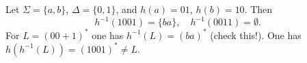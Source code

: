 

\setcounter{section}{3}
\setcounter{subsection}{4}
\setcounter{dfn}{16}

\begin{exl}
Let $\Sigma = \{a,b\}$, $\Delta = \{0, 1\}$, and $h(a) = 01$, $h(b) = 10$.
Then
\[
h^{-1}(1001) = \{ba\}, \quad h^{-1}(0011) = \emptyset.
\]
For $L = (00 + 1)^*$ one has $h^{-1}(L) = (ba)^*$ (check this!).
One has $h(h^{-1}(L)) = (1001)^* \ne L$.
\end{exl}

